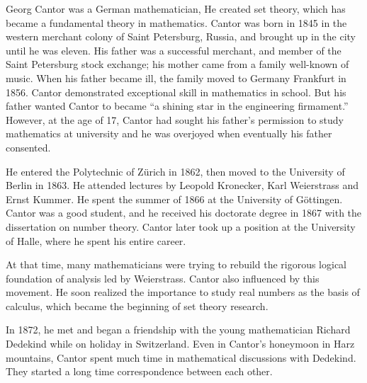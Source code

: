 \documentclass{article}
\begin{document}
Georg Cantor was a German mathematician, He created set theory, which has became a fundamental theory in mathematics. Cantor was born in 1845 in the western merchant colony of Saint Petersburg, Russia, and brought up in the city until he was eleven. His father was a successful merchant, and member of the Saint Petersburg stock exchange; his mother came from a family well-known of music. When his father became ill, the family moved to Germany Frankfurt in 1856. Cantor demonstrated exceptional skill in mathematics in school. But his father wanted Cantor to became ``a shining star in the engineering firmament.'' However, at the age of 17, Cantor had sought his father's permission to study mathematics at university and he was overjoyed when eventually his father consented\cite{HanXueTao16}.

He entered the Polytechnic of Zürich in 1862, then moved to the University of Berlin in 1863. He attended lectures by Leopold Kronecker, Karl Weierstrass and Ernst Kummer. He spent the summer of 1866 at the University of Göttingen. Cantor was a good student, and he received his doctorate degree in 1867 with the dissertation on number theory. Cantor later took up a position at the University of Halle, where he spent his entire career.

At that time, many mathematicians were trying to rebuild the rigorous logical foundation of analysis led by Weierstrass. Cantor also influenced by this movement. He soon realized the importance to study real numbers as the basis of calculus, which became the beginning of set theory research.

In 1872, he met and began a friendship with the young mathematician Richard Dedekind while on holiday in Switzerland. Even in Cantor's honeymoon in Harz mountains, Cantor spent much time in mathematical discussions with Dedekind. They started a long time correspondence between each other.
\end{document}
